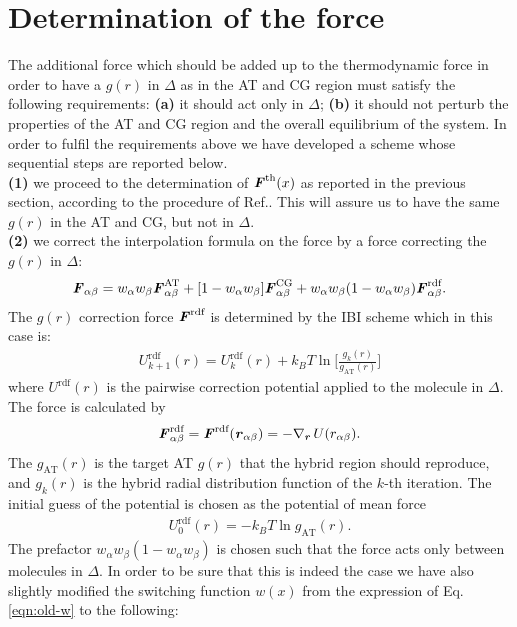 \documentclass[aps,pre,preprint]{revtex4}
\renewcommand{\v}[1]{\textbf{\textit{#1}}}
\begin{document}
\section{Determination of the force}
The additional force which should be added up to the thermodynamic force in order to have a $g(r)$ in $\Delta$ as in the AT and CG region must satisfy the following requirements: {\bf (a)} it should act only in $\Delta$; {\bf (b)} it should not perturb the properties of the AT and CG region and the overall equilibrium of the system. In order to fulfil the requirements  above we have developed a scheme whose sequential steps are reported below.\\
{\bf (1)} we proceed to the determination of ${\v F}^{\textrm{th}}(x)$ as reported in the previous section, according to the procedure of Ref.\cite{prlgc}. This will assure us to have the same $g(r)$ in the AT and CG, but not in $\Delta$.\\
{\bf (2)} we correct the interpolation formula on the force by a force correcting the $g(r)$ in $\Delta$:
\begin{align}
  \v F_{\alpha\beta} = w_\alpha w_\beta\v F^{\textrm{AT}}_{\alpha\beta} + [1-w_\alpha w_\beta]\v F^{\textrm{CG}}_{\alpha\beta} + w_\alpha w_\beta (1-w_\alpha w_\beta)\v F_{\alpha\beta}^{\textrm{rdf}}.
\label{grf}
\end{align}
The $g(r)$ correction force $\v F^{\textrm{rdf}}$ is determined by the IBI scheme which in this case is: 
\begin{align}\label{eqn:ibi}
  U^{\textrm{rdf}}_{k+1}(r) = U^{\textrm{rdf}}_k(r) +
  k_B T\ln\bigg[
  \frac{g_k(r)}{g_{\textrm{AT}}(r)}
  \bigg]
\end{align}
where $U^{\textrm{rdf}}(r)$ is the pairwise correction potential
applied to the molecule in $\Delta$. The force is
calculated by
\begin{align}
  \v F^{\textrm{rdf}}_{\alpha\beta} = \v F^{\textrm{rdf}}(\v r_{\alpha\beta})
  = -\nabla_{\v r}\,U(r_{\alpha\beta}).
\end{align}
The $g_{\textrm{AT}}(r)$ is the target AT $g(r)$ that the hybrid
region should reproduce, and $g_k(r)$ is the hybrid radial distribution function of the $k$-th
iteration.  The initial guess of the potential is chosen as the
potential of mean force
\begin{align}\label{eqn:pmf}
  U^{\textrm{rdf}}_0(r) = -k_BT \ln g_{\textrm{AT}}(r).
\end{align} 
The prefactor $ w_\alpha w_\beta (1-w_\alpha w_\beta)$ is chosen such that the force acts only between molecules in $\Delta$. In order to be sure that this is indeed the case we have also slightly modified the switching function $w(x)$ from the expression of Eq.\ref{eqn:old-w} to the following:
\end{document}
